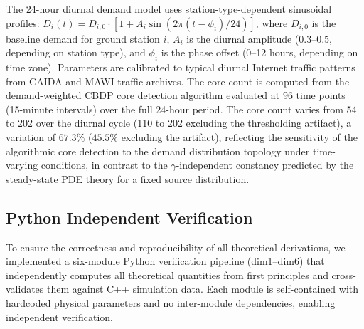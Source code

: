\documentclass[sn-nature,pdflatex]{sn-jnl}
\begin{document}
The 24-hour diurnal demand model uses station-type-dependent sinusoidal profiles: $D_i(t) = D_{i,0} \cdot [1 + A_i \sin(2\pi(t - \phi_i)/24)]$, where $D_{i,0}$ is the baseline demand for ground station $i$, $A_i$ is the diurnal amplitude (0.3--0.5, depending on station type), and $\phi_i$ is the phase offset (0--12 hours, depending on time zone). Parameters are calibrated to typical diurnal Internet traffic patterns from CAIDA and MAWI traffic archives. The core count is computed from the demand-weighted CBDP core detection algorithm evaluated at 96 time points (15-minute intervals) over the full 24-hour period. The core count varies from 54 to 202 over the diurnal cycle (110 to 202 excluding the thresholding artifact), a variation of $67.3\%$ ($45.5\%$ excluding the artifact), reflecting the sensitivity of the algorithmic core detection to the demand distribution topology under time-varying conditions, in contrast to the $\gamma$-independent constancy predicted by the steady-state PDE theory for a fixed source distribution.

\subsection{Python Independent Verification}

To ensure the correctness and reproducibility of all theoretical derivations, we implemented a six-module Python verification pipeline (dim1--dim6) that independently computes all theoretical quantities from first principles and cross-validates them against C++ simulation data. Each module is self-contained with hardcoded physical parameters and no inter-module dependencies, enabling independent verification.
\end{document}
